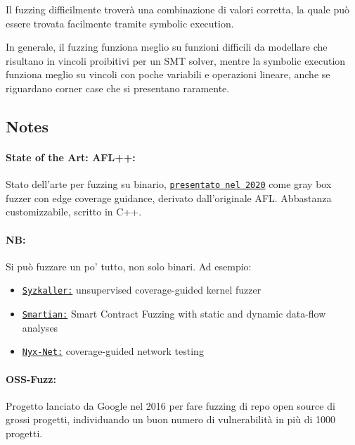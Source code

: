 Il fuzzing difficilmente troverà una combinazione di valori corretta, la quale può essere trovata facilmente tramite symbolic execution.

In generale, il fuzzing funziona meglio su funzioni difficili da modellare che risultano in vincoli proibitivi per un SMT solver, mentre la symbolic execution funziona meglio su vincoli con poche variabili e operazioni lineare, anche se riguardano corner case che si presentano raramente.

\vfill

\subsection*{Notes}

\paragraph{State of the Art: AFL++:} Stato dell'arte per fuzzing su binario, \href{https://www.usenix.org/system/files/woot20-paper-fioraldi.pdf}{\texttt{presentato nel 2020}} come gray box fuzzer con edge coverage guidance, derivato dall'originale AFL. Abbastanza customizzabile, scritto in C++. 

\paragraph{NB:} Si può fuzzare un po' tutto, non solo binari. Ad esempio:
\begin{itemize}
	\item \href{https://github.com/google/syzkaller}{\texttt{Syzkaller:}} unsupervised coverage-guided kernel fuzzer

	\item \href{https://softsec.kaist.ac.kr/~sangkilc/papers/choi-ase2021.pdf}{\texttt{Smartian:}} Smart Contract Fuzzing with static and dynamic data-flow analyses

	\item \href{https://dl.acm.org/doi/pdf/10.1145/3492321.3519591}{\texttt{Nyx-Net:}} coverage-guided network testing
\end{itemize}

\paragraph{OSS-Fuzz:} Progetto lanciato da Google nel 2016 per fare fuzzing di repo open source di grossi progetti, individuando un buon numero di vulnerabilità in più di 1000 progetti.


